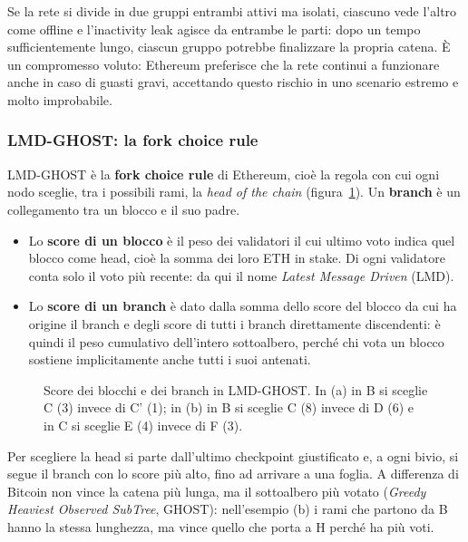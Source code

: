 \documentclass[a4paper, 11pt, oneside]{book}
\begin{document}
	\begin{nota}
		Se la rete si divide in due gruppi entrambi attivi ma isolati, ciascuno vede
		l'altro come offline e l'inactivity leak agisce da entrambe le parti: dopo un
		tempo sufficientemente lungo, ciascun gruppo potrebbe finalizzare la propria
		catena. È un compromesso voluto: Ethereum preferisce che la rete continui a
		funzionare anche in caso di guasti gravi, accettando questo rischio in uno
		scenario estremo e molto improbabile.
	\end{nota}

	\subsubsection{LMD-GHOST: la fork choice rule}
	LMD-GHOST è la \textbf{fork choice rule} di Ethereum, cioè la regola con cui ogni
	nodo sceglie, tra i possibili rami, la \textit{head of the chain}
	(figura~\ref{fig:lmd-ghost}). Un \textbf{branch} è un collegamento tra un blocco e il
	suo padre.
	\begin{itemize}
		\item Lo \textbf{score di un blocco} è il peso dei validatori il cui ultimo voto
			indica quel blocco come head, cioè la somma dei loro ETH in stake. Di ogni
			validatore conta solo il voto più recente: da qui il nome \textit{Latest
			Message Driven} (LMD).
		\item Lo \textbf{score di un branch} è dato dalla somma dello score del blocco da
			cui ha origine il branch e degli score di tutti i branch direttamente
			discendenti: è quindi il peso cumulativo dell'intero sottoalbero, perché chi
			vota un blocco sostiene implicitamente anche tutti i suoi antenati.
	\end{itemize}

	\begin{figure}[H]
		\centering
		
		\caption{Score dei blocchi e dei branch in LMD-GHOST. In (a) in B si sceglie C
			(3) invece di C' (1); in (b) in B si sceglie C (8) invece di D (6) e in C si
			sceglie E (4) invece di F (3).}
		\label{fig:lmd-ghost}
	\end{figure}

	Per scegliere la head si parte dall'ultimo checkpoint giustificato e, a ogni bivio,
	si segue il branch con lo score più alto, fino ad arrivare a una foglia. A differenza
	di Bitcoin non vince la catena più lunga, ma il sottoalbero più votato
	(\textit{Greedy Heaviest Observed SubTree}, GHOST): nell'esempio (b) i rami che
	partono da B hanno la stessa lunghezza, ma vince quello che porta a H perché ha più
	voti.
\end{document}
